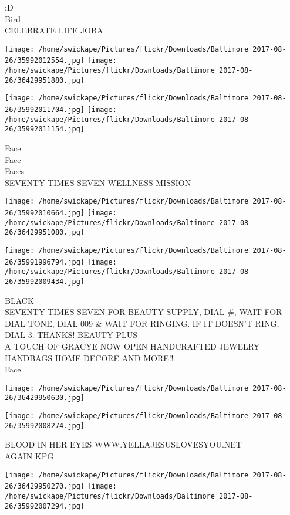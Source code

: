 \documentclass[10pt,letterpaper]{article}
\begin{document}
:D\\
Bird\\
CELEBRATE LIFE JOBA
\pagebreak

\texttt{[image: /home/swickape/Pictures/flickr/Downloads/Baltimore 2017-08-26/35992012554.jpg]}
\texttt{[image: /home/swickape/Pictures/flickr/Downloads/Baltimore 2017-08-26/36429951880.jpg]}

\texttt{[image: /home/swickape/Pictures/flickr/Downloads/Baltimore 2017-08-26/35992011704.jpg]}
\texttt{[image: /home/swickape/Pictures/flickr/Downloads/Baltimore 2017-08-26/35992011154.jpg]}

Face\\
Face\\
Faces\\
SEVENTY TIMES SEVEN WELLNESS MISSION
\pagebreak

\texttt{[image: /home/swickape/Pictures/flickr/Downloads/Baltimore 2017-08-26/35992010664.jpg]}
\texttt{[image: /home/swickape/Pictures/flickr/Downloads/Baltimore 2017-08-26/36429951080.jpg]}

\texttt{[image: /home/swickape/Pictures/flickr/Downloads/Baltimore 2017-08-26/35991996794.jpg]}
\texttt{[image: /home/swickape/Pictures/flickr/Downloads/Baltimore 2017-08-26/35992009434.jpg]}

BLACK\\
SEVENTY TIMES SEVEN FOR BEAUTY SUPPLY, DIAL \#, WAIT FOR DIAL TONE, DIAL 009 \& WAIT FOR RINGING.  IF IT DOESN'T RING, DIAL 3.  THANKS!  BEAUTY PLUS\\
A TOUCH OF GRACYE NOW OPEN HANDCRAFTED JEWELRY HANDBAGS HOME DECORE AND MORE!!\\
Face
\pagebreak

\texttt{[image: /home/swickape/Pictures/flickr/Downloads/Baltimore 2017-08-26/36429950630.jpg]}

\vspace{0.25in}
\texttt{[image: /home/swickape/Pictures/flickr/Downloads/Baltimore 2017-08-26/35992008274.jpg]}

BLOOD IN HER EYES WWW.YELLAJESUSLOVESYOU.NET\\
AGAIN KPG
\pagebreak

\texttt{[image: /home/swickape/Pictures/flickr/Downloads/Baltimore 2017-08-26/36429950270.jpg]}
\texttt{[image: /home/swickape/Pictures/flickr/Downloads/Baltimore 2017-08-26/35992007294.jpg]}
\end{document}
